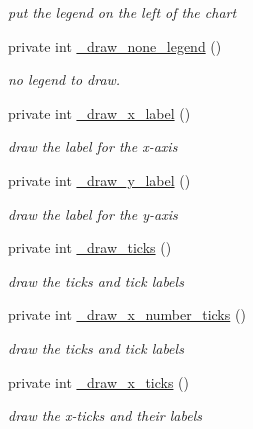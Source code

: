 \begin{DoxyCompactItemize}
\begin{DoxyCompactList}\small\item\em put the legend on the left of the chart \item\end{DoxyCompactList}\item 
private int \hyperlink{classChart_1_1Base_a2ec9e89bd6719e178877577a72750cb7}{\_\-draw\_\-none\_\-legend} ()
\begin{DoxyCompactList}\small\item\em no legend to draw. \item\end{DoxyCompactList}\item 
private int \hyperlink{classChart_1_1Base_a5ad71ca4e51c7d4876561737f048a6e7}{\_\-draw\_\-x\_\-label} ()
\begin{DoxyCompactList}\small\item\em draw the label for the x-\/axis \item\end{DoxyCompactList}\item 
private int \hyperlink{classChart_1_1Base_a6aafcea3c04d6a030a29892f04b25c1f}{\_\-draw\_\-y\_\-label} ()
\begin{DoxyCompactList}\small\item\em draw the label for the y-\/axis \item\end{DoxyCompactList}\item 
private int \hyperlink{classChart_1_1Base_a26f0a0f81ae5e6082c2e7f7c00981dac}{\_\-draw\_\-ticks} ()
\begin{DoxyCompactList}\small\item\em draw the ticks and tick labels \item\end{DoxyCompactList}\item 
private int \hyperlink{classChart_1_1Base_a4f10e76a428b6b09c7ac17a8d8212701}{\_\-draw\_\-x\_\-number\_\-ticks} ()
\begin{DoxyCompactList}\small\item\em draw the ticks and tick labels \item\end{DoxyCompactList}\item 
private int \hyperlink{classChart_1_1Base_a64a81b266a528e24e5547ac504c1fc78}{\_\-draw\_\-x\_\-ticks} ()
\begin{DoxyCompactList}\small\item\em draw the x-\/ticks and their labels \item\end{DoxyCompactList}\item 

\end{DoxyCompactItemize}
